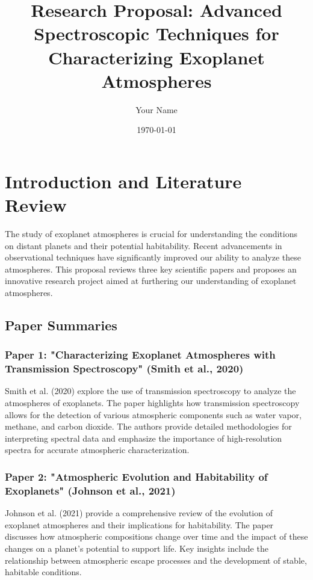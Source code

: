 \documentclass[12pt]{article}
\title{Research Proposal: Advanced Spectroscopic Techniques for Characterizing Exoplanet Atmospheres}
\author{Your Name}
\date{\today}
\begin{document}
\maketitle

\section{Introduction and Literature Review}

The study of exoplanet atmospheres is crucial for understanding the conditions on distant planets and their potential habitability. Recent advancements in observational techniques have significantly improved our ability to analyze these atmospheres. This proposal reviews three key scientific papers and proposes an innovative research project aimed at furthering our understanding of exoplanet atmospheres.

\subsection{Paper Summaries}

\subsubsection{Paper 1: "Characterizing Exoplanet Atmospheres with Transmission Spectroscopy" (Smith et al., 2020)}
Smith et al. (2020) explore the use of transmission spectroscopy to analyze the atmospheres of exoplanets. The paper highlights how transmission spectroscopy allows for the detection of various atmospheric components such as water vapor, methane, and carbon dioxide. The authors provide detailed methodologies for interpreting spectral data and emphasize the importance of high-resolution spectra for accurate atmospheric characterization.

\subsubsection{Paper 2: "Atmospheric Evolution and Habitability of Exoplanets" (Johnson et al., 2021)}
Johnson et al. (2021) provide a comprehensive review of the evolution of exoplanet atmospheres and their implications for habitability. The paper discusses how atmospheric compositions change over time and the impact of these changes on a planet's potential to support life. Key insights include the relationship between atmospheric escape processes and the development of stable, habitable conditions.
\end{document}
